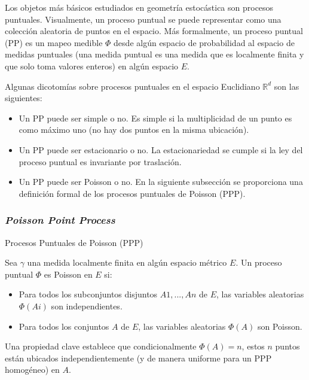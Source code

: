 Los objetos más básicos estudiados en geometría estocástica son procesos puntuales. Visualmente, un proceso puntual se puede representar como una colección aleatoria de puntos en el espacio. Más formalmente, un proceso puntual (PP) es un mapeo medible $\Phi$ desde algún espacio de probabilidad al espacio de medidas puntuales (una medida puntual es una medida que es localmente finita y que solo toma valores enteros) en algún espacio $E$.\newline

Algunas dicotomías sobre procesos puntuales en el espacio Euclidiano $\mathbb{R}^{d}$ son las siguientes:\newline

\begin{itemize}
    \item Un PP puede ser simple o no. Es simple si la multiplicidad de un punto es como máximo uno (no hay dos puntos en la misma ubicación).
    \item Un PP puede ser estacionario o no. La estacionariedad se cumple si la ley del proceso puntual es invariante por traslación.
    \item Un PP puede ser Poisson o no. En la siguiente subsección se proporciona una definición formal de los procesos puntuales de Poisson (PPP).
\end{itemize}


\subsubsection{\textit{Poisson Point Process}}
Procesos Puntuales de Poisson (PPP) \parencite{Haenggi2009}\newline

Sea $\gamma$ una medida localmente finita en algún espacio métrico $E$. Un proceso puntual $\Phi $ es Poisson en $E$ si:

\begin{itemize}
    \item Para todos los subconjuntos disjuntos $A1, ..., An$ de $E$, las variables aleatorias $\Phi(Ai)$ son independientes.
    \item Para todos los conjuntos $A$ de $E$, las variables aleatorias $\Phi(A)$ son Poisson.
\end{itemize}

Una propiedad clave establece que condicionalmente $\Phi(A)= n$, estos $n$ puntos están ubicados independientemente (y de manera uniforme para un PPP homogéneo) en $A$.\newline

